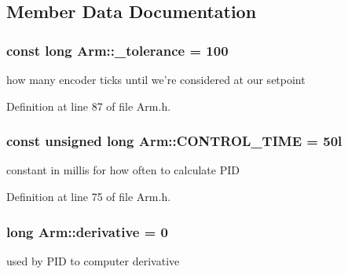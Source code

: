 \subsection{Member Data Documentation}
\hypertarget{classArm_af2251ac7ebd3c88f660e7a6dcc62ffd0}{
\subsubsection[{\-\_\-tolerance}]{\setlength{\rightskip}{0pt plus 5cm}const long Arm\-::\-\_\-tolerance = 100\hspace{0.3cm}{\ttfamily [private]}}}\label{classArm_af2251ac7ebd3c88f660e7a6dcc62ffd0}


how many encoder ticks until we're considered at our setpoint 



Definition at line 87 of file Arm.\-h.

\hypertarget{classArm_ae85014b5f9a8698790faa73bae76217c}{
\subsubsection[{C\-O\-N\-T\-R\-O\-L\-\_\-\-T\-I\-M\-E}]{\setlength{\rightskip}{0pt plus 5cm}const unsigned long Arm\-::\-C\-O\-N\-T\-R\-O\-L\-\_\-\-T\-I\-M\-E = 50l\hspace{0.3cm}{\ttfamily [private]}}}\label{classArm_ae85014b5f9a8698790faa73bae76217c}


constant in millis for how often to calculate P\-I\-D 



Definition at line 75 of file Arm.\-h.

\hypertarget{classArm_ad8cf7ca1ae47f7ddffcffb02889c8c69}{
\subsubsection[{derivative}]{\setlength{\rightskip}{0pt plus 5cm}long Arm\-::derivative = 0\hspace{0.3cm}{\ttfamily [private]}}}\label{classArm_ad8cf7ca1ae47f7ddffcffb02889c8c69}


used by P\-I\-D to computer derivative 



